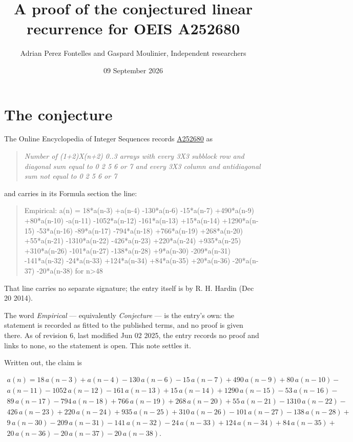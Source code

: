 \documentclass[11pt]{article}
\title{A proof of the conjectured linear recurrence for OEIS A252680}
\author{Adrian Perez Fontelles and Gaspard Moulinier, Independent researchers}
\date{09 September 2026}
\theoremstyle{definition}
\begin{document}
\maketitle
\section{The conjecture}

The Online Encyclopedia of Integer Sequences records \href{https://oeis.org/A252680}{A252680} as

\begin{quote}\itshape Number of (1+2)X(n+2) 0..3 arrays with every 3X3 subblock row and diagonal sum equal to 0 2 5 6 or 7 and every 3X3 column and antidiagonal sum not equal to 0 2 5 6 or 7\end{quote}

and carries in its Formula section the line:

\begin{quote}\ttfamily Empirical: a(n) = 18*a(n-3) +a(n-4) -130*a(n-6) -15*a(n-7) +490*a(n-9) +80*a(n-10) -a(n-11) -1052*a(n-12) -161*a(n-13) +15*a(n-14) +1290*a(n-15) -53*a(n-16) -89*a(n-17) -794*a(n-18) +766*a(n-19) +268*a(n-20) +55*a(n-21) -1310*a(n-22) -426*a(n-23) +220*a(n-24) +935*a(n-25) +310*a(n-26) -101*a(n-27) -138*a(n-28) +9*a(n-30) -209*a(n-31) -141*a(n-32) -24*a(n-33) +124*a(n-34) +84*a(n-35) +20*a(n-36) -20*a(n-37) -20*a(n-38) for n>48\end{quote}

That line carries no separate signature; the entry itself is by R. H. Hardin (Dec 20 2014).

The word {\itshape Empirical} --- equivalently {\itshape Conjecture} --- is the entry's own: the statement is recorded as fitted to the published terms, and no proof is given there. As of revision 6, last modified Jun 02 2025, the entry records no proof and links to none, so the statement is open. This note settles it.

Written out, the claim is

\begin{multline*} a(n) = 18\,a(n-3) + a(n-4) - 130\,a(n-6) - 15\,a(n-7) + 490\,a(n-9) + 80\,a(n-10) - \\ a(n-11) - 1052\,a(n-12) - 161\,a(n-13) + 15\,a(n-14) + 1290\,a(n-15) - 53\,a(n-16) - \\ 89\,a(n-17) - 794\,a(n-18) + 766\,a(n-19) + 268\,a(n-20) + 55\,a(n-21) - 1310\,a(n-22) - \\ 426\,a(n-23) + 220\,a(n-24) + 935\,a(n-25) + 310\,a(n-26) - 101\,a(n-27) - 138\,a(n-28) + \\ 9\,a(n-30) - 209\,a(n-31) - 141\,a(n-32) - 24\,a(n-33) + 124\,a(n-34) + 84\,a(n-35) + \\ 20\,a(n-36) - 20\,a(n-37) - 20\,a(n-38). \end{multline*}
\end{document}
